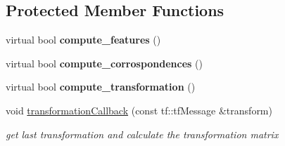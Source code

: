 \subsection*{Protected Member Functions}
\begin{DoxyCompactItemize}
\item 
\hypertarget{classRegistration__RGBDSLAM_a4160e4cbc8a7cfeda378e9da0495618d}{
virtual bool {\bfseries compute\_\-features} ()}
\label{classRegistration__RGBDSLAM_a4160e4cbc8a7cfeda378e9da0495618d}

\item 
\hypertarget{classRegistration__RGBDSLAM_ad9156fba578117effbb54669808df3fa}{
virtual bool {\bfseries compute\_\-corrospondences} ()}
\label{classRegistration__RGBDSLAM_ad9156fba578117effbb54669808df3fa}

\item 
\hypertarget{classRegistration__RGBDSLAM_a9a57f40c068a98520efb4401fb07f0e0}{
virtual bool {\bfseries compute\_\-transformation} ()}
\label{classRegistration__RGBDSLAM_a9a57f40c068a98520efb4401fb07f0e0}

\item 
\hypertarget{classRegistration__RGBDSLAM_a6d80282ad1d5547295f43a3018ea735b}{
void \hyperlink{classRegistration__RGBDSLAM_a6d80282ad1d5547295f43a3018ea735b}{transformationCallback} (const tf::tfMessage \&transform)}
\label{classRegistration__RGBDSLAM_a6d80282ad1d5547295f43a3018ea735b}

\begin{DoxyCompactList}\small\item\em get last transformation and calculate the transformation matrix \item\end{DoxyCompactList}\end{DoxyCompactItemize}
